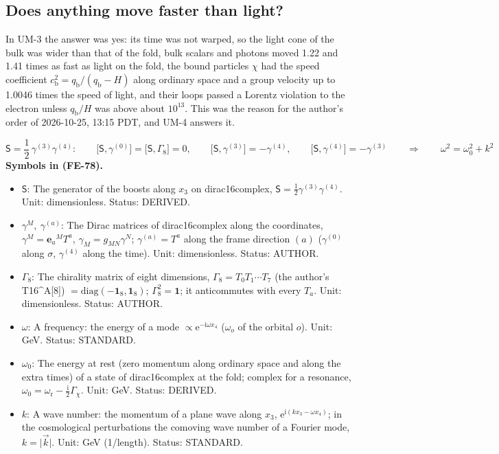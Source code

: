 \documentclass[
  10pt,
]{article}
\providecommand{\tightlist}{%
  \setlength{\itemsep}{0pt}\setlength{\parskip}{0pt}}
\begin{document}
\hypertarget{does-anything-move-faster-than-light}{%
\subsection{Does anything move faster than
light?}\label{does-anything-move-faster-than-light}}

In UM-3 the answer was yes: its time was not warped, so the light cone
of the bulk was wider than that of the fold, bulk scalars and photons
moved 1.22 and 1.41 times as fast as light on the fold, the bound
particles \(\chi\) had the speed coefficient
\(c_{\mathrm{b}}^2 = q_{\mathrm{b}}/(q_{\mathrm{b}} - H)\) along
ordinary space and a group velocity up to 1.0046 times the speed of
light, and their loops passed a Lorentz violation to the electron unless
\(q_{\mathrm{b}}/H\) was above about \(10^{13}\). This was the reason
for the author's order of 2026-10-25, 13:15 PDT, and UM-4 answers it.

\[
\mathsf{S} = \frac12\,\gamma^{(3)}\gamma^{(4)}:\qquad
\big[\mathsf{S}, \gamma^{(0)}\big] = \big[\mathsf{S}, \Gamma_8\big] = 0,\qquad
\big[\mathsf{S}, \gamma^{(3)}\big] = -\gamma^{(4)},\qquad \big[\mathsf{S}, \gamma^{(4)}\big] = -\gamma^{(3)}\qquad\Rightarrow\qquad
\omega^2 = \omega_0^2 + k^2 \tag{FE-78}
\] \textbf{Symbols in (FE-78).}

\begin{itemize}
\tightlist
\item
  \(\mathsf{S}\): The generator of the boosts along \(x_3\) on
  dirac16complex, \(\mathsf{S} = \frac12\gamma^{(3)}\gamma^{(4)}\).
  Unit: dimensionless. Status: DERIVED.
\item
  \(\gamma^M,\ \gamma^{(a)}\): The Dirac matrices of dirac16complex
  along the coordinates, \(\gamma^M = \mathbf{e}_a{}^MT^a\),
  \(\gamma_M = g_{MN}\gamma^N\); \(\gamma^{(a)} = T^a\) along the frame
  direction \((a)\) (\(\gamma^{(0)}\) along \(\sigma\), \(\gamma^{(4)}\)
  along the time). Unit: dimensionless. Status: AUTHOR.
\item
  \(\Gamma_8\): The chirality matrix of eight dimensions,
  \(\Gamma_8 = T_0T_1\cdots T_7\) (the author's T16\^{}A{[}8{]})
  \(= \mathrm{diag}(-\mathbf{1}_8, \mathbf{1}_8)\);
  \(\Gamma_8^2 = \mathbf{1}\); it anticommutes with every \(T_a\). Unit:
  dimensionless. Status: AUTHOR.
\item
  \(\omega\): A frequency: the energy of a mode
  \(\propto \mathrm{e}^{-\mathrm{i}\omega x_4}\) (\(\omega_o\) of the
  orbital \(o\)). Unit: GeV. Status: STANDARD.
\item
  \(\omega_0\): The energy at rest (zero momentum along ordinary space
  and along the extra times) of a state of dirac16complex at the fold;
  complex for a resonance,
  \(\omega_0 = \omega_{\mathrm{r}} - \frac{\mathrm{i}}{2}\Gamma_\chi\).
  Unit: GeV. Status: DERIVED.
\item
  \(k\): A wave number: the momentum of a plane wave along \(x_3\),
  \(\mathrm{e}^{\mathrm{i}(kx_3 - \omega x_4)}\); in the cosmological
  perturbations the comoving wave number of a Fourier mode,
  \(k = \lvert\vec k\rvert\). Unit: GeV (1/length). Status: STANDARD.
\end{itemize}
\end{document}

